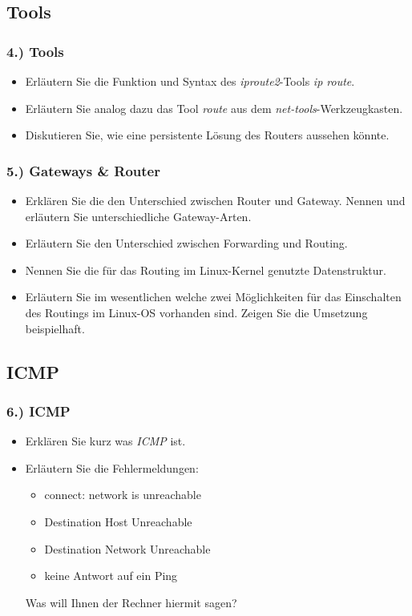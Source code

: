 \documentclass[xcolor=dvipsnames, aspectratio=169]{beamer}
\begin{document}
\subsection{Tools}
\begin{frame}
	\frametitle{4.) Tools}
	\begin{itemize}
		\item Erläutern Sie die Funktion und Syntax des \emph{iproute2}-Tools \emph{ip route}.
		\item Erläutern Sie analog dazu das Tool \emph{route} aus dem \emph{net-tools}-Werkzeugkasten.
		\item Diskutieren Sie, wie eine persistente Lösung des Routers aussehen könnte.
	\end{itemize}
\end{frame}

\begin{frame}
\frametitle{5.) Gateways \& Router}
	\begin{itemize}
		\item Erklären Sie die den Unterschied zwischen Router und Gateway. Nennen und erläutern Sie unterschiedliche Gateway-Arten. 
		\item Erläutern Sie den Unterschied zwischen Forwarding und Routing.
		\item Nennen Sie die für das Routing im Linux-Kernel genutzte Datenstruktur.
		\item Erläutern Sie im wesentlichen welche zwei Möglichkeiten für das Einschalten des Routings im Linux-OS vorhanden sind. Zeigen Sie die Umsetzung beispielhaft.
	\end{itemize}
\end{frame}

\subsection{ICMP}
\begin{frame}
\frametitle{6.) ICMP}
	\begin{itemize}
		\item Erklären Sie kurz was \emph{ICMP} ist. 
		\item Erläutern Sie die Fehlermeldungen:
		\begin{itemize}
			\item connect: network is unreachable
			\item Destination Host Unreachable
			\item Destination Network Unreachable
			\item keine Antwort auf ein Ping
		\end{itemize}
		Was will Ihnen der Rechner hiermit sagen?
	\end{itemize}
\end{frame}
\end{document}
